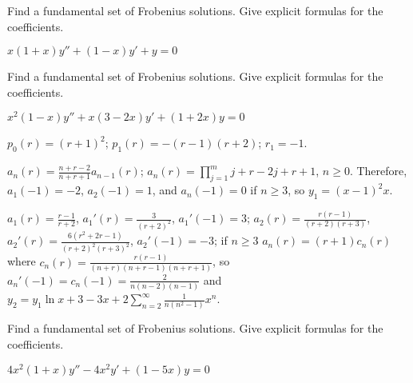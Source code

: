 \documentclass{ximera}
\begin{document}
\begin{problem}\label{exer:7.6.45}
Find a
fundamental set of Frobenius solutions. Give explicit formulas for the
coefficients.

$x(1+x)y''+(1-x)y'+y=0$
\end{problem}

\begin{problem}\label{exer:7.6.46}
Find a
fundamental set of Frobenius solutions. Give explicit formulas for the
coefficients.

$x^2(1-x)y''+x(3-2x)y'+(1+2x)y=0$

\begin{solution}
    $p_0(r)=(r+1)^2$;
$p_1(r)=-(r-1)(r+2)$;
$r_1=-1$.


$a_n(r)=\frac{n+r-2}{ n+r+1}
a_{n-1}(r)$;
 $a_n(r)=\prod_{j=1}^m{j+r-2}{ j+r+1}$,
$n\geq 0$. Therefore,$a_1(-1)=-2$, $a_2(-1)=1$, and $a_n(-1)=0$
if $n\geq 3$, so
$y_1={(x-1)^2}{ x}$.

$a_1(r)=\frac{r-1}{ r+2}$, $a_1'(r)=\frac{3}{(r+2)^2}$,
$a_1'(-1)=3$;
$a_2(r)=\frac
{r(r-1)}{(r+2)(r+3)}$,
$a_2'(r)=\frac
{6(r^2+2r-1)}{(r+2)^2(r+3)^2}$,
$a_2'(-1)=-3$;
if $n\geq 3$
$a_n(r)=(r+1)c_n(r)$ where
$c_n(r)=\frac{r(r-1)}{(n+r)(n+r-1)(n+r+1)}$, so $a_n'(-1)=c_n(-1)=
\frac{2}{ n(n-2)(n-1)}$ and
 $y_2=y_1\ln x+3-3x+2\sum_{n=2}^\infty
\frac{1}{ n(n^2-1)}x^n$.
\end{solution}
\end{problem}

\begin{problem}\label{exer:7.6.47}
Find a
fundamental set of Frobenius solutions. Give explicit formulas for the
coefficients.

$4x^2(1+x)y''-4x^2y'+(1-5x)y=0$
\end{problem}
\end{document}
